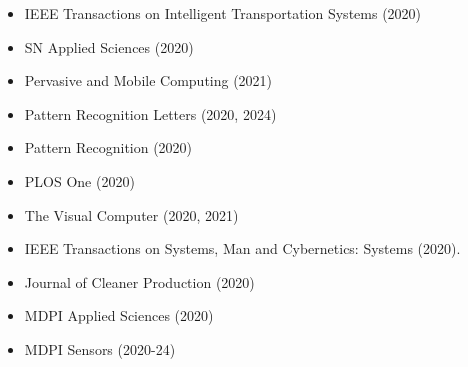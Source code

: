 \begin{itemize}
\item IEEE Transactions on Intelligent Transportation Systems (2020)

\item SN Applied Sciences (2020)

\item Pervasive and Mobile Computing (2021)

\item Pattern Recognition Letters (2020, 2024)

\item Pattern Recognition (2020)

\item PLOS One (2020)

\item The Visual Computer (2020, 2021)

\item IEEE Transactions on Systems, Man and Cybernetics: Systems (2020).

\item Journal of Cleaner Production (2020)

\item MDPI Applied Sciences (2020)

\item MDPI Sensors (2020-24)

\end{itemize}

